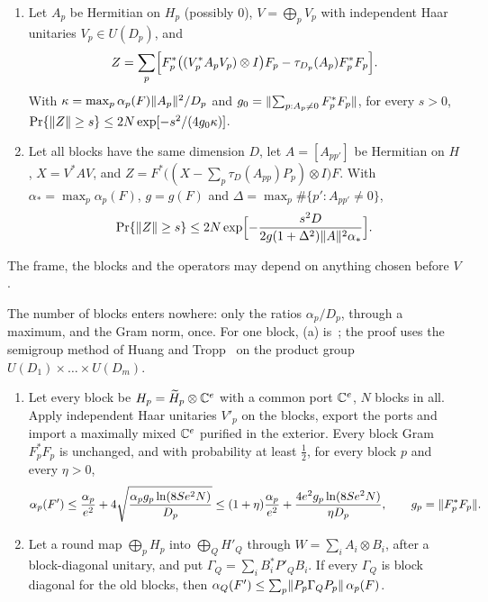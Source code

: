 \begin{lemma}\label{lem:concentration}
\begin{enumerate}[label=(\alph*),itemsep=1pt]
\item Let $A_p$ be Hermitian on $H_p$ (possibly $0$), $V=\bigoplus_pV_p$ with independent Haar unitaries $V_p\in U(D_p)$, and
\[
Z=\sum_p\Bigl[F_p^*\bigl((V_p^*A_pV_p)\otimes I\bigr)F_p-\tau_{D_p}(A_p)F_p^*F_p\Bigr].
\]
With $\kappa=\max_p\alpha_p(F)\lVert A_p\rVert^2/D_p$ and $g_0=\lVert \sum_{p:A_p\ne0}F_p^*F_p\rVert$, for every $s>0$,
$\Pr\{\lVert Z\rVert\ge s\}\le2N\exp[-s^2/(4g_0\kappa)]$.
\item Let all blocks have the same dimension $D$, let $A=[A_{pp'}]$ be Hermitian on $H$, $X=V^*AV$, and
$Z=F^*\bigl((X-\sum_p\tau_D(A_{pp})P_p)\otimes I\bigr)F$. With $\alpha_*=\max_p\alpha_p(F)$, $g=g(F)$ and
$\Delta=\max_p\#\{p':A_{pp'}\ne0\}$,
\[
\Pr\{\lVert Z\rVert\ge s\}\le2N\exp\Bigl[-\frac{s^2D}{2g(1+\Delta^2)\lVert A\rVert^2\alpha_*}\Bigr].
\]
\end{enumerate}
The frame, the blocks and the operators may depend on anything chosen before $V$.
\end{lemma}

The number of blocks enters nowhere: only the ratios $\alpha_p/D_p$, through a maximum, and the Gram norm, once. For one block, (a)
is~\cite[Lemma~A.1]{DouglasMghirbiB}; the proof uses the semigroup method of Huang and Tropp~\cite{HuangTropp2021} on the product group
$U(D_1)\times\dots\times U(D_m)$.

\begin{lemma}\label{lem:export}
\begin{enumerate}[label=(\alph*),itemsep=1pt]
\item Let every block be $H_p=\widetilde H_p\otimes\mathbb C^e$ with a common port $\mathbb C^e$, $N$ blocks in all. Apply independent Haar unitaries
$V'_p$ on the blocks, export the ports and import a maximally mixed $\mathbb C^e$ purified in the exterior. Every block Gram $F_p^*F_p$ is unchanged,
and with probability at least $\frac12$, for every block $p$ and every $\eta>0$,
\[
\alpha_p(F')\le\frac{\alpha_p}{e^2}+4\sqrt{\frac{\alpha_pg_p\ln(8Se^2N)}{D_p}}\le(1+\eta)\frac{\alpha_p}{e^2}+\frac{4e^2g_p\ln(8Se^2N)}{\eta D_p},
\qquad g_p=\lVert F_p^*F_p\rVert.
\]
\item Let a round map $\bigoplus_pH_p$ into $\bigoplus_QH'_Q$ through $W=\sum_iA_i\otimes B_i$, after a block-diagonal unitary, and put
$\Gamma_Q=\sum_iB_i^*P'_QB_i$. If every $\Gamma_Q$ is block diagonal for the old blocks, then $\alpha_Q(F')\le\sum_p\lVert P_p\Gamma_QP_p\rVert\,\alpha_p(F)$.
\end{enumerate}
\end{lemma}

